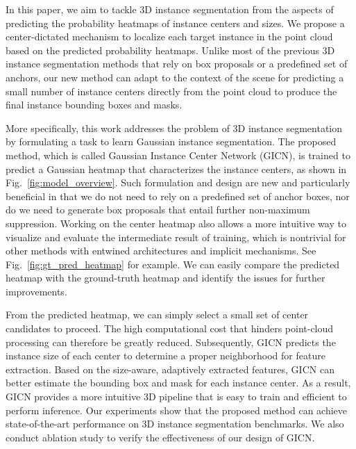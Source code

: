\documentclass[runningheads]{llncs}
\begin{document}
In this paper, we aim to tackle 3D instance segmentation from the aspects of predicting the probability heatmaps of instance centers and sizes. 
We propose a center-dictated mechanism to localize each target instance in the point cloud based on the predicted probability heatmaps. 
Unlike most of the previous 3D instance segmentation methods that rely on box proposals or a predefined set of anchors, our new method can adapt to the context of the scene for predicting a small number of instance centers directly from the point cloud to produce the final instance bounding boxes and masks.

More specifically, this work addresses the problem of 3D instance segmentation by formulating a task to learn Gaussian instance segmentation. The proposed method, which is called Gaussian Instance Center Network (GICN), is trained to predict a Gaussian heatmap that characterizes the instance centers, as shown in Fig.~\ref{fig:model_overview}. Such formulation and design are new and particularly beneficial in that we do not need to rely on a predefined set of anchor boxes, nor do we need to generate box proposals that entail further non-maximum suppression. 
Working on the center heatmap also allows a more intuitive way to visualize and evaluate the intermediate result of training, which is nontrivial for other methods with entwined architectures and implicit mechanisms. See Fig.~\ref{fig:gt_pred_heatmap} for example. We can easily compare the predicted heatmap with the ground-truth heatmap and identify the issues for further improvements.

From the predicted heatmap, we can simply select a small set of center candidates to proceed. The high computational cost that hinders point-cloud processing can therefore be greatly reduced. Subsequently, GICN predicts the instance size of each center to determine a proper neighborhood for feature extraction. Based on the size-aware, adaptively extracted features, GICN can better estimate the bounding box and mask for each instance center. As a result, GICN provides a more intuitive 3D pipeline that is easy to train and efficient to perform inference. Our experiments show that the proposed method can achieve state-of-the-art performance on 3D instance segmentation benchmarks. We also conduct ablation study to verify the effectiveness of our design of GICN. 
\end{document}
